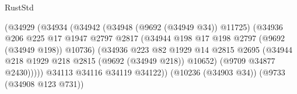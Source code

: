 \begin{lexlean}{RustStd}
\begin{coremodule}
{\begin{coremodule}
{{{{{{{{{{{{{{{{{{{{{{{{{{{{{{{{{{{{{{{{{{{{{{{{{{{{{{{                                                  (@34929
                                                    (@34934
                                                      (@34942
                                                        (@34948 (@9692 (@34949 @34)) @11725)
                                                        (@34936
                                                          @206
                                                          @225
                                                          @17
                                                          @1947
                                                          @2797
                                                          @2817
                                                          (@34944
                                                            @198
                                                            @17
                                                            @198
                                                            @2797
                                                            (@9692 (@34949 @198))
                                                            @10736)
                                                          (@34936
                                                            @223
                                                            @82
                                                            @1929
                                                            @14
                                                            @2815
                                                            @2695
                                                            (@34944
                                                              @218
                                                              @1929
                                                              @218
                                                              @2815
                                                              (@9692 (@34949 @218))
                                                              @10652)
                                                            (@9709 @34877 @2430)))))
                                                    @34113
                                                    @34116
                                                    @34119
                                                    @34122))
                                                (@10236 (@34903 @34))
                                                (@9733 (@34908 @123 @731))
}}}}}}}}}}}}}}}}}}}}}}}}}}}}}}}}}}}}}}}}}}}}}}}}}}}}}}}
\end{coremodule}}
\end{coremodule}
\end{lexlean}
